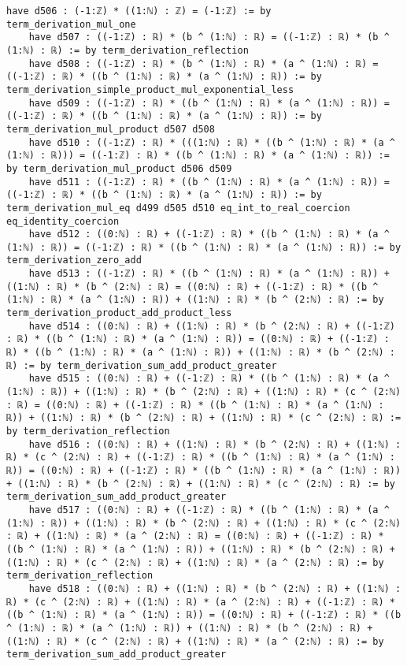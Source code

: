 \documentclass{article}
\begin{document}
\begin{tcolorbox}[colback=white!10, width=\linewidth]
\begin{lstlisting}[language=Lean4]
    have d506 : (-1:ℤ) * ((1:ℕ) : ℤ) = (-1:ℤ) := by term_derivation_mul_one
    have d507 : ((-1:ℤ) : ℝ) * (b ^ (1:ℕ) : ℝ) = ((-1:ℤ) : ℝ) * (b ^ (1:ℕ) : ℝ) := by term_derivation_reflection
    have d508 : ((-1:ℤ) : ℝ) * (b ^ (1:ℕ) : ℝ) * (a ^ (1:ℕ) : ℝ) = ((-1:ℤ) : ℝ) * ((b ^ (1:ℕ) : ℝ) * (a ^ (1:ℕ) : ℝ)) := by term_derivation_simple_product_mul_exponential_less
    have d509 : ((-1:ℤ) : ℝ) * ((b ^ (1:ℕ) : ℝ) * (a ^ (1:ℕ) : ℝ)) = ((-1:ℤ) : ℝ) * ((b ^ (1:ℕ) : ℝ) * (a ^ (1:ℕ) : ℝ)) := by term_derivation_mul_product d507 d508
    have d510 : ((-1:ℤ) : ℝ) * (((1:ℕ) : ℝ) * ((b ^ (1:ℕ) : ℝ) * (a ^ (1:ℕ) : ℝ))) = ((-1:ℤ) : ℝ) * ((b ^ (1:ℕ) : ℝ) * (a ^ (1:ℕ) : ℝ)) := by term_derivation_mul_product d506 d509
    have d511 : ((-1:ℤ) : ℝ) * ((b ^ (1:ℕ) : ℝ) * (a ^ (1:ℕ) : ℝ)) = ((-1:ℤ) : ℝ) * ((b ^ (1:ℕ) : ℝ) * (a ^ (1:ℕ) : ℝ)) := by term_derivation_mul_eq d499 d505 d510 eq_int_to_real_coercion eq_identity_coercion
    have d512 : ((0:ℕ) : ℝ) + ((-1:ℤ) : ℝ) * ((b ^ (1:ℕ) : ℝ) * (a ^ (1:ℕ) : ℝ)) = ((-1:ℤ) : ℝ) * ((b ^ (1:ℕ) : ℝ) * (a ^ (1:ℕ) : ℝ)) := by term_derivation_zero_add
    have d513 : ((-1:ℤ) : ℝ) * ((b ^ (1:ℕ) : ℝ) * (a ^ (1:ℕ) : ℝ)) + ((1:ℕ) : ℝ) * (b ^ (2:ℕ) : ℝ) = ((0:ℕ) : ℝ) + ((-1:ℤ) : ℝ) * ((b ^ (1:ℕ) : ℝ) * (a ^ (1:ℕ) : ℝ)) + ((1:ℕ) : ℝ) * (b ^ (2:ℕ) : ℝ) := by term_derivation_product_add_product_less
    have d514 : ((0:ℕ) : ℝ) + ((1:ℕ) : ℝ) * (b ^ (2:ℕ) : ℝ) + ((-1:ℤ) : ℝ) * ((b ^ (1:ℕ) : ℝ) * (a ^ (1:ℕ) : ℝ)) = ((0:ℕ) : ℝ) + ((-1:ℤ) : ℝ) * ((b ^ (1:ℕ) : ℝ) * (a ^ (1:ℕ) : ℝ)) + ((1:ℕ) : ℝ) * (b ^ (2:ℕ) : ℝ) := by term_derivation_sum_add_product_greater
    have d515 : ((0:ℕ) : ℝ) + ((-1:ℤ) : ℝ) * ((b ^ (1:ℕ) : ℝ) * (a ^ (1:ℕ) : ℝ)) + ((1:ℕ) : ℝ) * (b ^ (2:ℕ) : ℝ) + ((1:ℕ) : ℝ) * (c ^ (2:ℕ) : ℝ) = ((0:ℕ) : ℝ) + ((-1:ℤ) : ℝ) * ((b ^ (1:ℕ) : ℝ) * (a ^ (1:ℕ) : ℝ)) + ((1:ℕ) : ℝ) * (b ^ (2:ℕ) : ℝ) + ((1:ℕ) : ℝ) * (c ^ (2:ℕ) : ℝ) := by term_derivation_reflection
    have d516 : ((0:ℕ) : ℝ) + ((1:ℕ) : ℝ) * (b ^ (2:ℕ) : ℝ) + ((1:ℕ) : ℝ) * (c ^ (2:ℕ) : ℝ) + ((-1:ℤ) : ℝ) * ((b ^ (1:ℕ) : ℝ) * (a ^ (1:ℕ) : ℝ)) = ((0:ℕ) : ℝ) + ((-1:ℤ) : ℝ) * ((b ^ (1:ℕ) : ℝ) * (a ^ (1:ℕ) : ℝ)) + ((1:ℕ) : ℝ) * (b ^ (2:ℕ) : ℝ) + ((1:ℕ) : ℝ) * (c ^ (2:ℕ) : ℝ) := by term_derivation_sum_add_product_greater
    have d517 : ((0:ℕ) : ℝ) + ((-1:ℤ) : ℝ) * ((b ^ (1:ℕ) : ℝ) * (a ^ (1:ℕ) : ℝ)) + ((1:ℕ) : ℝ) * (b ^ (2:ℕ) : ℝ) + ((1:ℕ) : ℝ) * (c ^ (2:ℕ) : ℝ) + ((1:ℕ) : ℝ) * (a ^ (2:ℕ) : ℝ) = ((0:ℕ) : ℝ) + ((-1:ℤ) : ℝ) * ((b ^ (1:ℕ) : ℝ) * (a ^ (1:ℕ) : ℝ)) + ((1:ℕ) : ℝ) * (b ^ (2:ℕ) : ℝ) + ((1:ℕ) : ℝ) * (c ^ (2:ℕ) : ℝ) + ((1:ℕ) : ℝ) * (a ^ (2:ℕ) : ℝ) := by term_derivation_reflection
    have d518 : ((0:ℕ) : ℝ) + ((1:ℕ) : ℝ) * (b ^ (2:ℕ) : ℝ) + ((1:ℕ) : ℝ) * (c ^ (2:ℕ) : ℝ) + ((1:ℕ) : ℝ) * (a ^ (2:ℕ) : ℝ) + ((-1:ℤ) : ℝ) * ((b ^ (1:ℕ) : ℝ) * (a ^ (1:ℕ) : ℝ)) = ((0:ℕ) : ℝ) + ((-1:ℤ) : ℝ) * ((b ^ (1:ℕ) : ℝ) * (a ^ (1:ℕ) : ℝ)) + ((1:ℕ) : ℝ) * (b ^ (2:ℕ) : ℝ) + ((1:ℕ) : ℝ) * (c ^ (2:ℕ) : ℝ) + ((1:ℕ) : ℝ) * (a ^ (2:ℕ) : ℝ) := by term_derivation_sum_add_product_greater

\end{lstlisting}
\end{tcolorbox}
\end{document}
